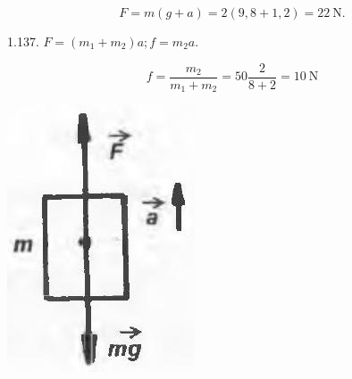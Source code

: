 \documentclass[10pt]{article}
\begin{document}
$$
F=m(g+a)=2(9,8+1,2)=22 \mathrm{~N} .
$$

1.137. $F=\left(m_{1}+m_{2}\right) a ; f=m_{2} a$.

$$
f=\frac{m_{2}}{m_{1}+m_{2}}=50 \frac{2}{8+2}=10 \mathrm{~N}
$$

\begin{center}
\includegraphics[max width=\textwidth]{2025_07_01_5b3ff9fa0d508c8e9f17g-227(1)}
\end{center}
\end{document}
